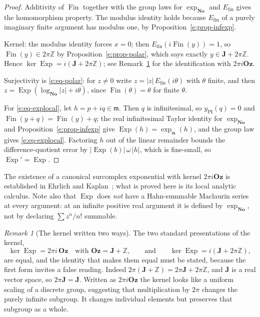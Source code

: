 \documentclass[11pt,a4paper]{article}
\numberwithin{equation}{section}
\theoremstyle{definition}
\theoremstyle{remark}
\newtheorem{remark}[theorem]{Remark}
\theoremstyle{plain}
\newcommand{\No}{\mathbf{No}}
\newcommand{\Oz}{\mathbf{Oz}}
\newcommand{\Jpi}{\mathbf J}
\newcommand{\ZZ}{\mathbb Z}
\newcommand{\mm}{\mathfrak m}
\DeclareMathOperator{\Exp}{Exp}
\newcommand{\abs}[1]{\lvert #1\rvert}
\begin{document}
\begin{proof}
Additivity of $\operatorname{Fin}$ together with the group laws for
$\exp_{\No}$ and $E_{\mathrm{fin}}$ gives the homomorphism property.  The
modulus identity holds because $E_{\mathrm{fin}}$ of a purely imaginary
finite argument has modulus one, by
Proposition~\ref{e:prop-infexp}.

Kernel: the modulus identity forces $x=0$; then
$E_{\mathrm{fin}}(i\operatorname{Fin}(y))=1$, so
$\operatorname{Fin}(y)\in2\pi\ZZ$ by
Proposition~\ref{e:prop-polar}, which says exactly
$y\in\Jpi+2\pi\ZZ$.  Hence $\ker\Exp=i(\Jpi+2\pi\ZZ)$; see
Remark~\ref{e:rem-kernel} for the identification with $2\pi i\Oz$.

Surjectivity is \eqref{e:eq-polar}: for $z\ne0$ write
$z=\abs z\,E_{\mathrm{fin}}(i\theta)$ with $\theta$ finite, and then
$z=\Exp(\log_{\No}\abs z+i\theta)$, since
$\operatorname{Fin}(\theta)=\theta$ for finite $\theta$.

For \eqref{e:eq-explocal}, let $h=p+iq\in\mm$.  Then $q$ is infinitesimal,
so $y_{\mathrm{PI}}(q)=0$ and $\operatorname{Fin}(y+q)=\operatorname{Fin}(y)+q$;
the real infinitesimal Taylor identity for $\exp_{\No}$ and
Proposition~\ref{e:prop-infexp} give $\Exp(h)=\exp_{\mm}(h)$, and the
group law gives \eqref{e:eq-explocal}.  Factoring $h$ out of the linear
remainder bounds the difference-quotient error by
$\abs{\Exp(b)}\,\omega\,\abs h$, which is fine-small, so $\Exp'=\Exp$.
\end{proof}

The existence of a canonical surcomplex exponential with kernel
$2\pi i\Oz$ is established in Ehrlich and Kaplan~\cite[Proposition~11.2 and
Theorem~11.1, pp.~33--34 of arXiv:2002.07739v3]{EK}; what is
proved here is its local analytic calculus.  Note also that $\Exp$ does
\emph{not} have a Hahn-summable Maclaurin series at every argument: at an
infinite positive real argument it is defined by $\exp_{\No}$, not by
declaring $\sum z^n/n!$ summable.

\begin{remark}[The kernel written two ways]\label{e:rem-kernel}
The two standard presentations of the kernel,
\[
 \ker\Exp=2\pi i\,\Oz\quad\text{with }\Oz=\Jpi+\ZZ,
 \qquad\text{and}\qquad
 \ker\Exp=i(\Jpi+2\pi\ZZ),
\]
are equal, and the identity that makes them equal must be stated, because
the first form invites a false reading.  Indeed
$2\pi(\Jpi+\ZZ)=2\pi\Jpi+2\pi\ZZ$, and $\Jpi$ is a real vector space, so
$2\pi\Jpi=\Jpi$.  Written as $2\pi i\Oz$ the kernel looks like a uniform
scaling of a discrete group, suggesting that multiplication by $2\pi$ changes the purely infinite subgroup.
It changes individual elements but preserves that subgroup as a whole.
\end{remark}
\end{document}
